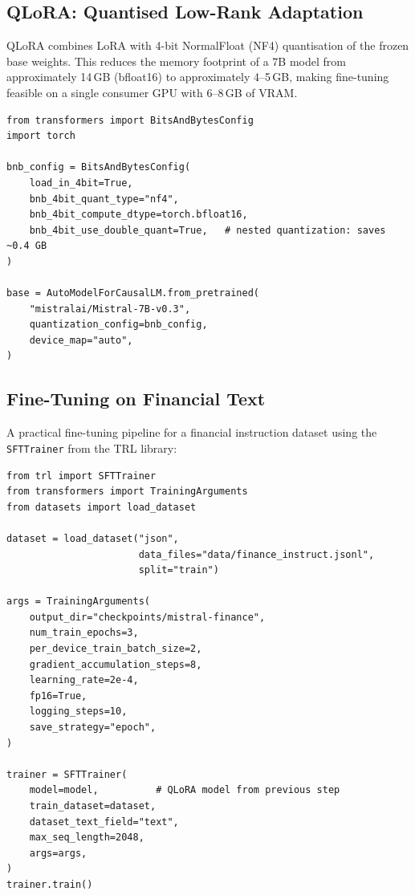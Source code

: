 \subsection{QLoRA: Quantised Low-Rank Adaptation}
\label{app:hf:qlora}

QLoRA \citep{dettmers2023qlora} combines LoRA with 4-bit NormalFloat (NF4)
quantisation of the frozen base weights.  This reduces the memory footprint
of a 7B model from approximately 14\,GB (bfloat16) to approximately 4--5\,GB,
making fine-tuning feasible on a single consumer GPU with 6--8\,GB of VRAM.

\begin{verbatim}
from transformers import BitsAndBytesConfig
import torch

bnb_config = BitsAndBytesConfig(
    load_in_4bit=True,
    bnb_4bit_quant_type="nf4",
    bnb_4bit_compute_dtype=torch.bfloat16,
    bnb_4bit_use_double_quant=True,   # nested quantization: saves ~0.4 GB
)

base = AutoModelForCausalLM.from_pretrained(
    "mistralai/Mistral-7B-v0.3",
    quantization_config=bnb_config,
    device_map="auto",
)
\end{verbatim}

\subsection{Fine-Tuning on Financial Text}
\label{app:hf:finetuning}

A practical fine-tuning pipeline for a financial instruction dataset using the
\texttt{SFTTrainer} from the TRL library:

\begin{verbatim}
from trl import SFTTrainer
from transformers import TrainingArguments
from datasets import load_dataset

dataset = load_dataset("json",
                       data_files="data/finance_instruct.jsonl",
                       split="train")

args = TrainingArguments(
    output_dir="checkpoints/mistral-finance",
    num_train_epochs=3,
    per_device_train_batch_size=2,
    gradient_accumulation_steps=8,
    learning_rate=2e-4,
    fp16=True,
    logging_steps=10,
    save_strategy="epoch",
)

trainer = SFTTrainer(
    model=model,          # QLoRA model from previous step
    train_dataset=dataset,
    dataset_text_field="text",
    max_seq_length=2048,
    args=args,
)
trainer.train()
\end{verbatim}

